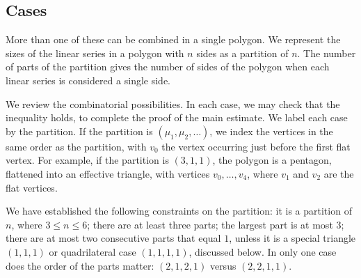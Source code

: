 \subsection{Cases}

More than one of these can be combined in a single polygon.  We represent the sizes of the linear series in a polygon with $n$ sides as a partition of $n$.
The number of parts of the partition gives the number of sides of the polygon when each linear series is considered a single side. 


We review the combinatorial possibilities.  In each case, we may check that the inequality holds, to complete the proof of the main estimate.  We label each 
case by the partition.  If the partition is $(\mu_1,\mu_2,\ldots)$, we
index the vertices in the same order as the partition, with $v_0$
the vertex occurring just before the first flat vertex.  For example,
if the partition is $(3,1,1)$, the polygon is a pentagon, flattened into
an effective triangle, with vertices $v_0,\ldots,v_4$, where $v_1$ and $v_2$
are the flat vertices.

We have established the following constraints on the partition: it is
a partition of $n$, where $3\le n\le 6$; there
are at least three parts; the largest part is at most $3$;  there are
at most two consecutive parts that equal $1$, unless it is a special triangle $(1,1,1)$ or
quadrilateral case $(1,1,1,1)$, discussed below.  In only one case
does the order of the parts matter: $(2,1,2,1)$ versus $(2,2,1,1)$.

